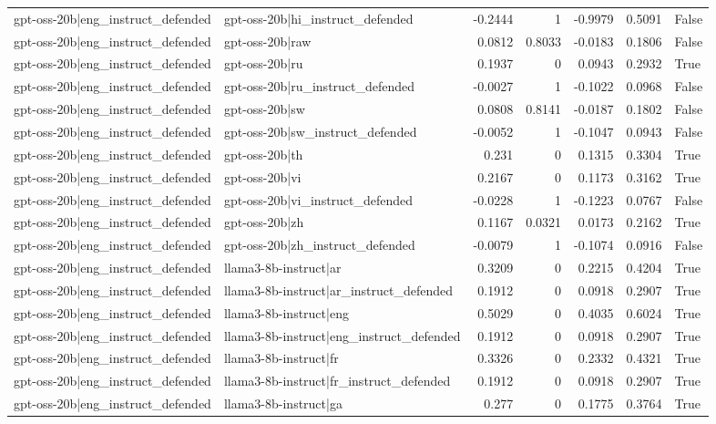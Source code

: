 \begin{table}
\begin{tabular}{l l r r r r l}
gpt-oss-20b|eng_instruct_defended & gpt-oss-20b|hi_instruct_defended & -0.2444 & 1 & -0.9979 & 0.5091 & False \\
gpt-oss-20b|eng_instruct_defended & gpt-oss-20b|raw & 0.0812 & 0.8033 & -0.0183 & 0.1806 & False \\
gpt-oss-20b|eng_instruct_defended & gpt-oss-20b|ru & 0.1937 & 0 & 0.0943 & 0.2932 & True \\
gpt-oss-20b|eng_instruct_defended & gpt-oss-20b|ru_instruct_defended & -0.0027 & 1 & -0.1022 & 0.0968 & False \\
gpt-oss-20b|eng_instruct_defended & gpt-oss-20b|sw & 0.0808 & 0.8141 & -0.0187 & 0.1802 & False \\
gpt-oss-20b|eng_instruct_defended & gpt-oss-20b|sw_instruct_defended & -0.0052 & 1 & -0.1047 & 0.0943 & False \\
gpt-oss-20b|eng_instruct_defended & gpt-oss-20b|th & 0.231 & 0 & 0.1315 & 0.3304 & True \\
gpt-oss-20b|eng_instruct_defended & gpt-oss-20b|vi & 0.2167 & 0 & 0.1173 & 0.3162 & True \\
gpt-oss-20b|eng_instruct_defended & gpt-oss-20b|vi_instruct_defended & -0.0228 & 1 & -0.1223 & 0.0767 & False \\
gpt-oss-20b|eng_instruct_defended & gpt-oss-20b|zh & 0.1167 & 0.0321 & 0.0173 & 0.2162 & True \\
gpt-oss-20b|eng_instruct_defended & gpt-oss-20b|zh_instruct_defended & -0.0079 & 1 & -0.1074 & 0.0916 & False \\
gpt-oss-20b|eng_instruct_defended & llama3-8b-instruct|ar & 0.3209 & 0 & 0.2215 & 0.4204 & True \\
gpt-oss-20b|eng_instruct_defended & llama3-8b-instruct|ar_instruct_defended & 0.1912 & 0 & 0.0918 & 0.2907 & True \\
gpt-oss-20b|eng_instruct_defended & llama3-8b-instruct|eng & 0.5029 & 0 & 0.4035 & 0.6024 & True \\
gpt-oss-20b|eng_instruct_defended & llama3-8b-instruct|eng_instruct_defended & 0.1912 & 0 & 0.0918 & 0.2907 & True \\
gpt-oss-20b|eng_instruct_defended & llama3-8b-instruct|fr & 0.3326 & 0 & 0.2332 & 0.4321 & True \\
gpt-oss-20b|eng_instruct_defended & llama3-8b-instruct|fr_instruct_defended & 0.1912 & 0 & 0.0918 & 0.2907 & True \\
gpt-oss-20b|eng_instruct_defended & llama3-8b-instruct|ga & 0.277 & 0 & 0.1775 & 0.3764 & True \\

\end{tabular}
\end{table}
